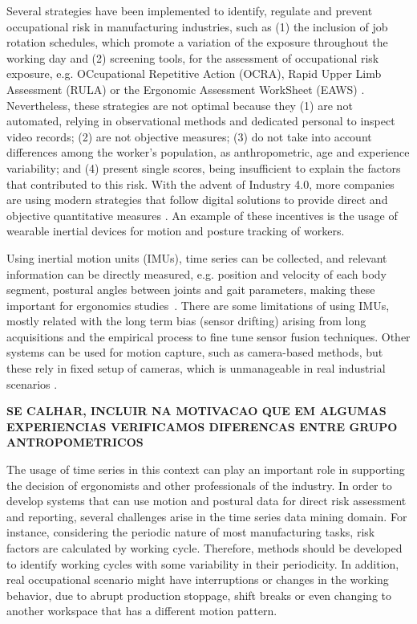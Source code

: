 Several strategies have been implemented to identify, regulate and prevent occupational risk in manufacturing industries, such as (1) the inclusion of job rotation schedules, which promote a variation of the exposure throughout the working day \cite{jobrotation} and (2) screening tools, for the assessment of occupational risk exposure, e.g. OCcupational Repetitive Action (OCRA), Rapid Upper Limb Assessment (RULA) or the Ergonomic Assessment WorkSheet (EAWS) \cite{ocra, rula, eaws}. Nevertheless, these strategies are not optimal because they (1) are not automated, relying in observational methods and dedicated personal to inspect video records; (2) are not objective measures; (3) do not take into account differences among the worker's population, as anthropometric, age and experience variability; and (4) present single scores, being insufficient to explain the factors that contributed to this risk. With the advent of Industry 4.0, more companies are using modern strategies that follow digital solutions to provide direct and objective quantitative measures \cite{romero}. An example of these incentives is the usage of wearable inertial devices for motion and posture tracking of workers.

Using inertial motion units (IMUs), time series can be collected, and relevant information can be directly measured, e.g. position and velocity of each body segment, postural angles between joints and gait parameters, making these important for ergonomics studies~\citep{Caputo2019, Hang19}. There are some limitations of using IMUs, mostly related with the long term bias (sensor drifting) arising from long acquisitions and the empirical process to fine tune sensor fusion techniques. Other systems can be used for motion capture, such as camera-based methods, but these rely in fixed setup of cameras, which is unmanageable in real industrial scenarios \cite{sara}.

\textbf{SE CALHAR, INCLUIR NA MOTIVACAO QUE EM ALGUMAS EXPERIENCIAS VERIFICAMOS DIFERENCAS ENTRE GRUPO ANTROPOMETRICOS}

The usage of time series in this context can play an important role in supporting the decision of ergonomists and other professionals of the industry. In order to develop systems that can use motion and postural data for direct risk assessment and reporting, several challenges arise in the time series data mining domain. For instance, considering the periodic nature of most manufacturing tasks, risk factors are calculated by working cycle. Therefore, methods should be developed to identify working cycles with some variability in their periodicity. In addition, real occupational scenario might have interruptions or changes in the working behavior, due to abrupt production stoppage, shift breaks or even changing to another workspace that has a different motion pattern. 

